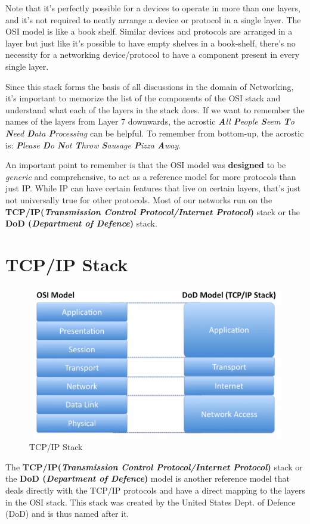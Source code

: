 \noindent
Note that it's perfectly possible for a devices to operate in more than one layers, and it's not required to neatly arrange a device or protocol in a single layer. The OSI model is like a book shelf. Similar devices and protocols are arranged in a layer but just like it's possible to have empty shelves in a book-shelf, there's no necessity for a networking device/protocol to have a component present in every single layer. 

Since this stack forms the basis of all discussions in the domain of Networking, it's important to memorize the list of the components of the OSI stack and understand what each of the layers in the stack does. If we want to remember the names of the layers from Layer 7 downwards, the acrostic \textit{\textbf{A}ll \textbf{P}eople \textbf{S}eem \textbf{T}o \textbf{N}eed \textbf{D}ata \textbf{P}rocessing} can be helpful. To remember from bottom-up, the acrostic is: \textit{\textbf{P}lease \textbf{D}o \textbf{N}ot \textbf{T}hrow \textbf{S}ausage \textbf{P}izza \textbf{A}way}. 

An important point to remember is that the OSI model was \textbf{designed} to be \textit{generic} and comprehensive, to act as a reference model for more protocols than just IP. While IP can have certain features that live on certain layers, that's just not universally true for other protocols. Most of our networks run on the \textbf{TCP/IP(\textit{Transmission Control Protocol/Internet Protocol})} stack or the \textbf{DoD (\textit{Department of Defence})} stack. 

\section{TCP/IP Stack}
\begin{figure}[H]
	\centering
	\includegraphics[width=0.55\linewidth]{"Mod1/chapters/1.1.b TCP-IP Stack"}
	\caption{TCP/IP Stack}
	\label{fig:1 TCP/IP Stack}
\end{figure}

The \textbf{TCP/IP(\textit{Transmission Control Protocol/Internet Protocol})} stack or the \textbf{DoD (\textit{Department of Defence})} model is another reference model that deals directly with the TCP/IP protocols and have a direct mapping to the layers in the OSI stack. This stack was created by the United States Dept. of Defence (DoD) and is thus named after it. 

